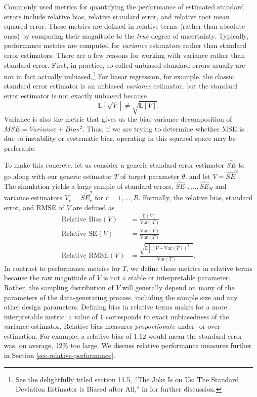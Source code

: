 \documentclass[
]{book}
\newcommand{\E}{\mathbb{E}}
\newcommand{\Var}{\text{Var}}
\begin{document}
Commonly used metrics for quantifying the performance of estimated standard errors include relative bias, relative standard error, and relative root mean squared error.
These metrics are defined in relative terms (rather than absolute ones) by comparing their magnitude to the \emph{true} degree of uncertainty.
Typically, performance metrics are computed for \emph{variance} estimators rather than standard error estimators.
There are a few reasons for working with variance rather than standard error.
First, in practice, so-called unbiased standard errors usually are not in fact actually unbiased.\footnote{See the delightfully titled section 11.5, ``The Joke Is on Us: The Standard Deviation Estimator is Biased after All,'' in \citet{westfall2013understanding} for further discussion.}
For linear regression, for example, the classic standard error estimator is an unbiased \emph{variance} estimator, but the standard error estimator is not exactly unbiased because
\[ 
\E[ \sqrt{ V } ] \neq \sqrt{ \E[ V ] }.
\]
Variance is also the metric that gives us the bias-variance decomposition of \(MSE = Variance + Bias^2\). Thus, if we are trying to determine whether MSE is due to instability or systematic bias, operating in this squared space may be preferable.

To make this concrete, let us consider a generic standard error estimator \(\widehat{SE}\) to go along with our generic estimator \(T\) of target parameter \(\theta\), and let \(V = \widehat{SE}^2\).
The simulation yields a large sample of standard errors, \(\widehat{SE}_1,...,\widehat{SE}_R\) and variance estimators \(V_r = \widehat{SE}_r^2\) for \(r = 1,...,R\).
Formally, the relative bias, standard error, and RMSE of \(V\) are defined as
\[
\begin{aligned}
\text{Relative Bias}(V) &= \frac{\E(V)}{\Var(T)} \\
\text{Relative SE}(V) &= \frac{\Var(V)}{\Var(T)} \\
\text{Relative RMSE}(V) &= \frac{\sqrt{\E\left[\left(V - \Var(T)\right)^2 \right]}}{\Var(T)}.
\end{aligned}
\label{eq:relative-bias-SE-RMSE}
\]
In contrast to performance metrics for \(T\), we define these metrics in relative terms because the raw magnitude of \(V\) is not a stable or interpretable parameter.
Rather, the sampling distribution of \(V\) will generally depend on many of the parameters of the data-generating process, including the sample size and any other design parameters.
Defining bias in relative terms makes for a more interpretable metric: a value of 1 corresponds to exact unbiasedness of the variance estimator.
Relative bias measures \emph{proportionate} under- or over-estimation.
For example, a relative bias of 1.12 would mean the standard error was, on average, 12\% too large.
We discuss relative performance measures further in Section \ref{sec-relative-performance}.
\end{document}

